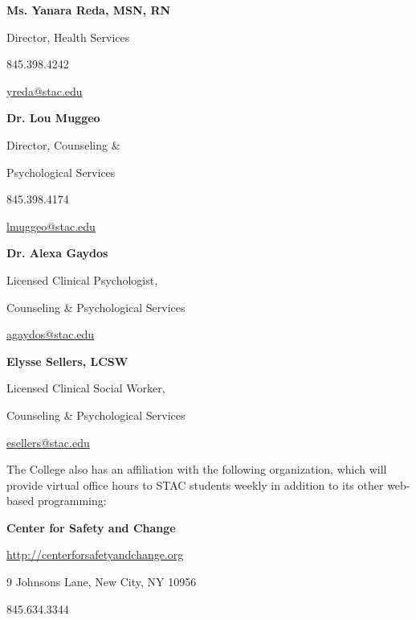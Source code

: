 \documentclass[11pt,letterpaper]{article}
\begin{document}
        \hfill\begin{minipage}[t]{0.49\textwidth}
        {\bfseries Ms. Yanara Reda, MSN, RN} \par
        Director, Health Services \par
        845.398.4242 \par
        \href{mailto:yreda@stac.edu}{yreda@stac.edu}
        \end{minipage}\begin{minipage}[t]{0.49\textwidth}
        {\bfseries Dr. Lou Muggeo} \par
        Director, Counseling \& \par
        Psychological Services \par
        845.398.4174 \par
        \href{mailto:lmuggeo@stac.edu}{lmuggeo@stac.edu}
        \end{minipage} \pspace
        \hfill\begin{minipage}[t]{0.49\textwidth} 
        {\bfseries Dr. Alexa Gaydos} \par
        Licensed Clinical Psychologist, \par
        Counseling \& Psychological Services \par
        \href{mailto:agaydos@stac.edu}{agaydos@stac.edu}
        \end{minipage}\begin{minipage}[t]{0.49\textwidth} 
        {\bfseries Elysse Sellers, LCSW} \par
        Licensed Clinical Social Worker, \par
        Counseling \& Psychological Services \par
        \href{mailto:esellers@stac.edu}{esellers@stac.edu}
        \end{minipage} \pspace

The College also has an affiliation with the following organization, which will provide virtual office hours to STAC students weekly in addition to its other web-based programming: \pspace
 
        \hspace{0.3cm} {\bfseries Center for Safety and Change} \par
        \hspace{0.3cm} \url{http://centerforsafetyandchange.org} \par
        \hspace{0.3cm} 9 Johnsons Lane, New City, NY 10956 \par
        \hspace{0.3cm} 845.634.3344
\sectionbreak
\end{document}
